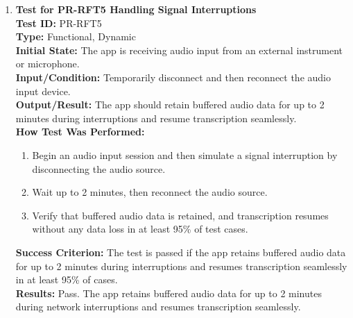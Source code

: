 \documentclass[12pt, titlepage]{article}
\begin{document}
\begin{enumerate}
    \item \textbf{Test for PR-RFT5 Handling Signal Interruptions} \\
      \newline
      \textbf{Test ID:} PR-RFT5 \\
      \textbf{Type:} Functional, Dynamic \\
      \textbf{Initial State:} The app is receiving audio input from an external instrument or microphone. \\
      \textbf{Input/Condition:} Temporarily disconnect and then reconnect the audio input device. \\
      \textbf{Output/Result:} The app should retain buffered audio data for up to 2 minutes during interruptions and resume 
      transcription seamlessly. \\
      \textbf{How Test Was Performed:}
      \begin{enumerate}
          \item Begin an audio input session and then simulate a signal interruption by disconnecting the audio source.
          \item Wait up to 2 minutes, then reconnect the audio source.
          \item Verify that buffered audio data is retained, and transcription resumes without any data loss in at least 95\% 
          of test cases.
      \end{enumerate}
      \textbf{Success Criterion:} The test is passed if the app retains buffered audio data for up to 2 minutes during interruptions
      and resumes transcription seamlessly in at least 95\% of cases.\\
      \textbf{Results:} Pass. The app retains buffered audio data for up to 2 minutes during network interruptions and resumes transcription seamlessly.\\


\end{enumerate}
\end{document}

